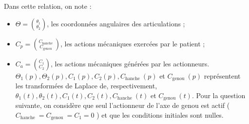 Dans cette relation, on note :

\begin{itemize}
  \item $\Theta=\binom{\theta_{1}}{\theta_{2}}$, les coordonnées angulaires des articulations ;
  \item $C_{p}=\binom{C_{\text {hanche }}}{C_{\text {genou }}}$, les actions mécaniques exercées par le patient ;
  \item $C_{a}=\binom{C_{1}}{C_{2}}$, les actions mécaniques générées par les actionneurs.\\
$\Theta_{1}(p), \Theta_{2}(p), C_{1}(p), C_{2}(p), C_{\text {hanche }}(p)$ et $C_{\text {genou }}(p)$ représentent les transformées de Laplace de, respectivement, $\theta_{1}(t), \theta_{2}(t), C_{1}(t), C_{2}(t), C_{\text {hanche }}(t)$ et $C_{\text {genou }}(t)$. Pour la question suivante, on considère que seul l'actionneur de l'axe de genou est actif ( $C_{\text {hanche }}=C_{\text {genou }}=C_{1}=0$ ) et que les conditions initiales sont nulles.\\
\end{itemize}
\fi



